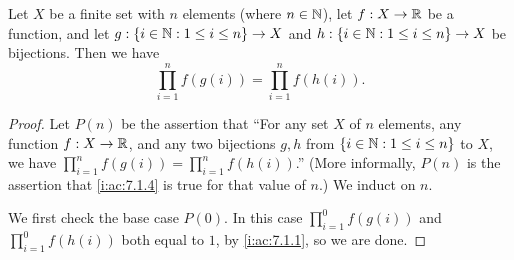 \begin{ac}\label{i:ac:7.1.4}
  Let \(X\) be a finite set with \(n\) elements (where \(n \in \mathbb{N}\)), let \(f : X \to \mathbb{R}\) be a function, and let \(g : \left\lbrace i \in \mathbb{N} : 1 \leq i \leq n\right\rbrace \to X\) and \(h : \left\lbrace i \in \mathbb{N} : 1 \leq i \leq n\right\rbrace \to X\) be bijections.
  Then we have
  \[
    \prod_{i = 1}^n f(g(i)) = \prod_{i = 1}^n f(h(i)).
  \]
\end{ac}

\begin{proof}
  Let \(P(n)\) be the assertion that ``For any set \(X\) of \(n\) elements, any function \(f : X \to \mathbb{R}\), and any two bijections \(g, h\) from \(\left\lbrace i \in \mathbb{N} : 1 \leq i \leq n\right\rbrace\) to \(X\), we have \(\prod_{i = 1}^n f(g(i)) = \prod_{i = 1}^n f(h(i))\).''
  (More informally, \(P(n)\) is the assertion that \cref{i:ac:7.1.4} is true for that value of \(n\).)
  We induct on \(n\).

  We first check the base case \(P(0)\).
  In this case \(\prod_{i = 1}^0 f(g(i))\) and \(\prod_{i = 1}^0 f(h(i))\) both equal to \(1\), by \cref{i:ac:7.1.1}, so we are done.


\end{proof}
